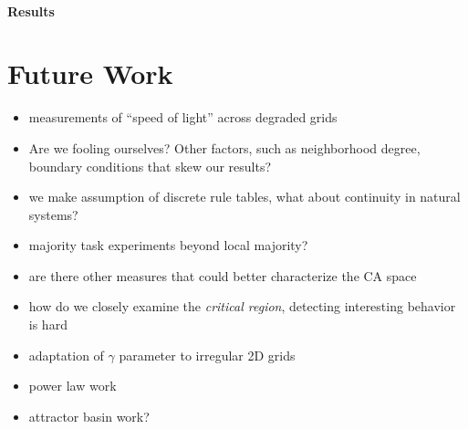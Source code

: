 \documentclass[a4paper,11pt]{report}
\begin{document}
\subsubsection*{Results}

\processdelayedfloats

\chapter{Future Work}
\label{ch:future_work}

\begin{itemize}

\item measurements of ``speed of light'' across degraded grids
\item Are we fooling ourselves? Other factors, such as neighborhood degree, boundary conditions that skew our results?

\item we make assumption of discrete rule tables, what about continuity in natural systems?

\item majority task experiments beyond local majority?

\item are there other measures that could better characterize the CA space
\item how do we closely examine the \textit{critical region}, detecting interesting behavior is hard
\item adaptation of $\gamma$ parameter to irregular 2D grids
\item power law work
\item attractor basin work?

\end{itemize}
\end{document}
